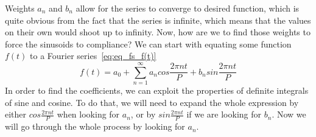 \documentclass{article}
\begin{document}
    Weights $a_n$ and $b_n$ allow for the series to converge to desired function, 
    which is quite obvious from the fact that the series is infinite, which means
    that the values on their own would shoot up to infinity. Now, how are we to 
    find those weights to force the sinusoids to compliance? We can start with 
    equating some function $f(t)$ to a Fourier series~\eqref{eq:eq_fs_f(t)}
    \begin{equation} \label{eq:eq_fs_f(t)}
        f(t) = a_0 + \sum_{n=1}^{\infty}a_ncos\frac{2\pi nt}{P} + b_n%
            sin\frac{2\pi nt}{P}
    \end{equation}
    In order to find the coefficients, we can exploit the properties of definite
    integrals of sine and cosine. To do that, we will need to expand the whole 
    expression by either $cos\frac{2\pi nt}{P}$ when looking for $a_n$, or by 
    $sin\frac{2\pi nt}{P}$ if we are looking for $b_n$. Now we will go through 
    the whole process by looking for $a_n$. 
\end{document}

